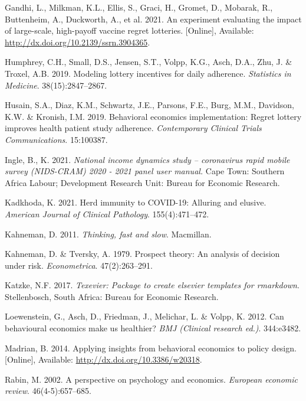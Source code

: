\documentclass[11pt,preprint, authoryear]{elsarticle}
\numberwithin{equation}{section}
\numberwithin{figure}{section}
\numberwithin{table}{section}
\newlength{\cslhangindent}
\newenvironment{CSLReferences}%
  {\setlength{\parindent}{0pt}%
  \everypar{\setlength{\hangindent}{\cslhangindent}}\ignorespaces}%
  {\par}
\begin{document}
\begin{CSLReferences}{1}{0}
\leavevmode\hypertarget{ref-regret}{}%
Gandhi, L., Milkman, K.L., Ellis, S., Graci, H., Gromet, D., Mobarak,
R., Buttenheim, A., Duckworth, A., et al. 2021. An experiment evaluating
the impact of large-scale, high-payoff vaccine regret lotteries.
{[}Online{]}, Available: \url{http://dx.doi.org/10.2139/ssrn.3904365}.

\leavevmode\hypertarget{ref-adhere}{}%
Humphrey, C.H., Small, D.S., Jensen, S.T., Volpp, K.G., Asch, D.A., Zhu,
J. \& Troxel, A.B. 2019. Modeling lottery incentives for daily
adherence. \emph{Statistics in Medicine}. 38(15):2847--2867.

\leavevmode\hypertarget{ref-regr}{}%
Husain, S.A., Diaz, K.M., Schwartz, J.E., Parsons, F.E., Burg, M.M.,
Davidson, K.W. \& Kronish, I.M. 2019. Behavioral economics
implementation: Regret lottery improves health patient study adherence.
\emph{Contemporary Clinical Trials Communications}. 15:100387.

\leavevmode\hypertarget{ref-nids}{}%
Ingle, B., K. 2021. \emph{National income dynamics study -- coronavirus
rapid mobile survey (NIDS-CRAM) 2020 - 2021 panel user manual.} Cape
Town: Southern Africa Labour; Development Research Unit: Bureau for
Economic Research.

\leavevmode\hypertarget{ref-bad}{}%
Kadkhoda, K. 2021. Herd immunity to COVID-19: Alluring and elusive.
\emph{American Journal of Clinical Pathology}. 155(4):471--472.

\leavevmode\hypertarget{ref-fast}{}%
Kahneman, D. 2011. \emph{Thinking, fast and slow}. Macmillan.

\leavevmode\hypertarget{ref-prospect}{}%
Kahneman, D. \& Tversky, A. 1979. Prospect theory: An analysis of
decision under risk. \emph{Econometrica}. 47(2):263--291.

\leavevmode\hypertarget{ref-Texevier}{}%
Katzke, N.F. 2017. \emph{{Texevier}: {P}ackage to create elsevier
templates for rmarkdown}. Stellenbosch, South Africa: Bureau for
Economic Research.

\leavevmode\hypertarget{ref-health}{}%
Loewenstein, G., Asch, D., Friedman, J., Melichar, L. \& Volpp, K. 2012.
Can behavioural economics make us healthier? \emph{BMJ (Clinical
research ed.)}. 344:e3482.

\leavevmode\hypertarget{ref-flu}{}%
Madrian, B. 2014. Applying insights from behavioral economics to policy
design. {[}Online{]}, Available: \url{http://dx.doi.org/10.3386/w20318}.

\leavevmode\hypertarget{ref-rabin}{}%
Rabin, M. 2002. A perspective on psychology and economics.
\emph{European economic review}. 46(4-5):657--685.


\end{CSLReferences}
\end{document}
